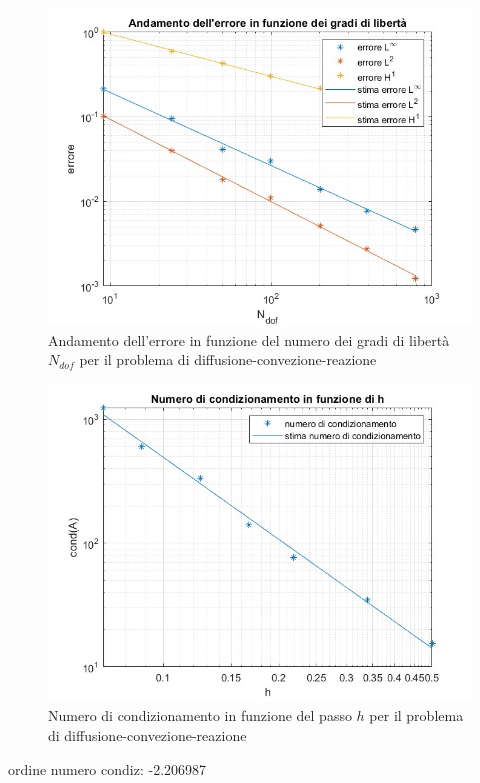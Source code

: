 \documentclass[%
	corpo=11pt,
    twoside,
    stile=classica,
    oldstyle,
    tipotesi=custom,
    greek,
    evenboxes,
]{toptesi}
\begin{document}
    \begin{figure}[htbp]
  \centering
    \includegraphics[scale=0.4]{Pictures/errore-neumannfunzinv-gdl.jpg}
    \caption{Andamento dell'errore in funzione del numero dei gradi di libertà $N_{dof}$ per il problema di diffusione-convezione-reazione}
    \label{fig:neumann_gdl}
    \end{figure}

\begin{figure}[htbp]
  \centering
    \includegraphics[scale=0.4]{Pictures/condiz-neumannfunzinv.jpg}
    \caption{Numero di condizionamento in funzione del passo $h$ per il problema di diffusione-convezione-reazione}
    \label{fig:neumann_cond}
    \end{figure}

ordine numero condiz: -2.206987


%
\end{document}
